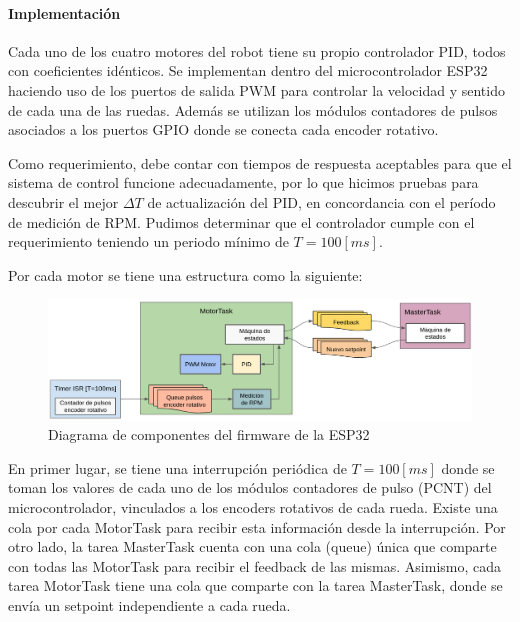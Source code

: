 \paragraph{Implementación} \mbox{} \vspace{8pt}

Cada uno de los cuatro motores del robot tiene su propio controlador PID, todos con coeficientes idénticos. Se implementan dentro del microcontrolador ESP32 haciendo uso de los puertos de salida PWM para controlar la velocidad y sentido de cada una de las ruedas. Además se utilizan los módulos contadores de pulsos asociados a los puertos GPIO donde se conecta cada encoder rotativo.

Como requerimiento, debe contar con tiempos de respuesta aceptables para que el sistema de control funcione adecuadamente, por lo que hicimos pruebas para descubrir el mejor $\Delta T$ de actualización del PID, en concordancia con el período de medición de RPM. Pudimos determinar que el controlador cumple con el requerimiento teniendo un periodo mínimo de $T=100[ms]$.

Por cada motor se tiene una estructura como la siguiente:

\begin{figure}[H]
    \centering
    \hspace*{-0.75cm}
    \includegraphics[width=1.1\linewidth]{images/diag_comp_esp32_pid_solo.png}
    \caption{Diagrama de componentes del firmware de la ESP32}
    \label{fig:diagcomponentesp32}
\end{figure}

En primer lugar, se tiene una interrupción periódica de $T=100[ms]$ donde se toman los valores de cada uno de los módulos contadores de pulso (PCNT) del microcontrolador, vinculados a los encoders rotativos de cada rueda. Existe una cola por cada MotorTask para recibir esta información desde la interrupción. Por otro lado, la tarea MasterTask cuenta con una cola (queue) única que comparte con todas las MotorTask para recibir el feedback de las mismas. Asimismo, cada tarea MotorTask tiene una cola que comparte con la tarea MasterTask, donde se envía un setpoint independiente a cada rueda.

